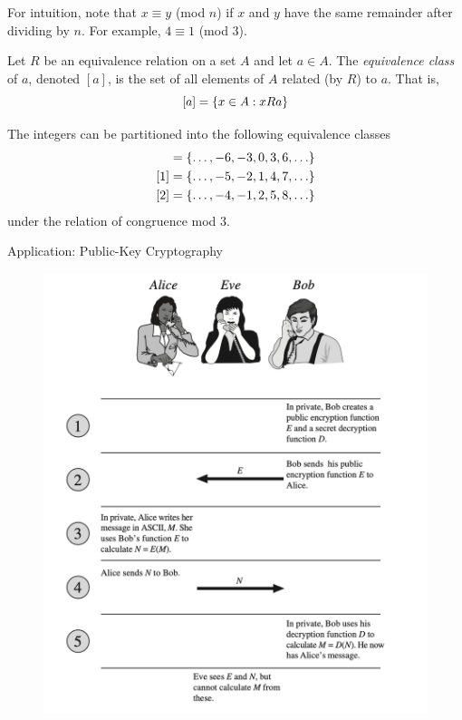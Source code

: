 \documentclass[10pt]{beamer}
\begin{document}
\begin{frame}
\small 
 \begin{myredbox}[title=Remark]  
 For intuition, note that $x \equiv y$ (mod $n$) if $x$ and $y$ have the same remainder after dividing by $n$.  For example, $4 \equiv 1$ (mod 3).	 
\end{myredbox}
\vfill 
\begin{mygreenbox}[title=Definition]
Let $R$ be an equivalence relation on a set $A$ and let $a \in A$.   The \textit{equivalence class} of $a$, denoted $[a]$, is the set of all elements of $A$ related (by $R$) to $a$.  That is,
\[  [a] = \{ {x \in A: xRa} \}\]
\end{mygreenbox}
\vfill 
\begin{myyellowbox}[title=Example]
The integers can be partitioned into the following equivalence classes
%
\begin{align*}
[0] &= \set{\hdots, -6, -3, 0, 3, 6, \hdots} \\	
[1] &= \set{\hdots, -5, -2, 1, 4, 7, \hdots} \\	
[2] &= \set{\hdots, -4, -1, 2, 5, 8, \hdots} \\	
\end{align*}
%
under the relation of congruence mod 3.
\end{myyellowbox}

\end{frame}


\begin{frame}{Application: Public-Key Cryptography}
\footnotesize 
\begin{figure}[ht]
        \centering
        \includegraphics[width=.65\textwidth]{images/cryptography}
\end{figure}
\vfill 
\end{frame}
\end{document}
